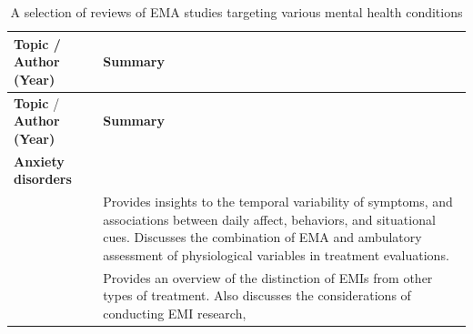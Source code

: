 \documentclass[]{book}
\begin{document}

\begin{longtable}[]{@{}ll@{}}
\caption{\label{tab:emareviews} A selection of reviews of EMA studies
targeting various mental health conditions}\tabularnewline
\toprule
\begin{minipage}[b]{0.33\columnwidth}\raggedright\strut
\textbf{Topic} / \textbf{Author (Year)}\strut
\end{minipage} & \begin{minipage}[b]{0.61\columnwidth}\raggedright\strut
\textbf{Summary}\strut
\end{minipage}\tabularnewline
\midrule
\endfirsthead
\toprule
\begin{minipage}[b]{0.33\columnwidth}\raggedright\strut
\textbf{Topic} / \textbf{Author (Year)}\strut
\end{minipage} & \begin{minipage}[b]{0.61\columnwidth}\raggedright\strut
\textbf{Summary}\strut
\end{minipage}\tabularnewline
\midrule
\endhead
\begin{minipage}[t]{0.33\columnwidth}\raggedright\strut
\textbf{Anxiety disorders}\strut
\end{minipage} & \begin{minipage}[t]{0.61\columnwidth}\raggedright\strut
\strut
\end{minipage}\tabularnewline
\begin{minipage}[t]{0.33\columnwidth}\raggedright\strut
\citet{Walz2014}\strut
\end{minipage} & \begin{minipage}[t]{0.61\columnwidth}\raggedright\strut
Provides insights to the temporal variability of symptoms, and
associations between daily affect, behaviors, and situational cues.
Discusses the combination of EMA and ambulatory assessment of
physiological variables in treatment evaluations.\strut
\end{minipage}\tabularnewline
\begin{minipage}[t]{0.33\columnwidth}\raggedright\strut
\citet{schueller2017}\strut
\end{minipage} & \begin{minipage}[t]{0.61\columnwidth}\raggedright\strut
Provides an overview of the distinction of EMIs from other types of
treatment. Also discusses the considerations of conducting EMI research,

\end{minipage}
\end{longtable}
\end{document}
